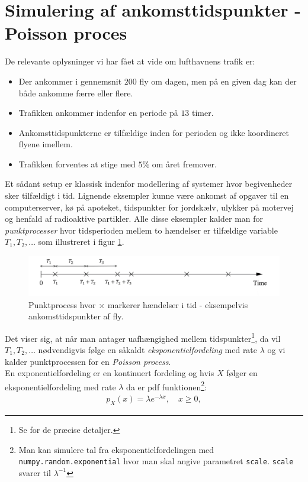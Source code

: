 \documentclass{article}
\begin{document}
\section{Simulering af ankomsttidspunkter - Poisson proces}
De relevante oplysninger vi har fået at vide om lufthavnens trafik er:
\begin{itemize}
\item Der ankommer i gennemsnit $200$ fly om dagen, men på en given dag kan der både ankomme færre eller flere.
\item Trafikken ankommer indenfor en periode på $13$ timer. 
\item Ankomsttidspunkterne er tilfældige inden for perioden og ikke koordineret flyene imellem. 
\item Trafikken forventes at stige med $5\%$ om året fremover. 
\end{itemize}
Et sådant setup er klassisk indenfor modellering af systemer hvor begivenheder sker tilfældigt i tid. Lignende eksempler kunne være ankomst af opgaver til en computerserver, kø på apoteket, tidspunkter for jordskælv, ulykker på motervej og henfald af radioaktive partikler. Alle disse eksempler kalder man for \textit{punktprocesser} hvor tidsperioden mellem to hændelser er tilfældige variable $T_1, T_2,\dots$ som illustreret i figur \ref{fig:process1}. 
\begin{figure}
\centering
\includegraphics[width = \textwidth]{process1.png}
\caption{Punktprocess hvor $\times$ markerer hændelser i tid - eksempelvis ankomsttidspunkter af fly.} \label{fig:process1}
\end{figure}
Det viser sig, at når man antager uafhængighed mellem tidspunkter\footnote{Se \cite[123-127]{olofsson2012} for de præcise detaljer.}, da vil $T_1, T_2,\dots$ nødvendigvis følge en såkaldt \textit{eksponentielfordeling} med rate $\lambda$ og vi kalder punktprocessen for en \textit{Poisson process}. \\
En exponentielfordeling er en kontinuert fordeling og hvis $X$ følger en eksponentielfordeling med rate $\lambda$ da er pdf funktionen\footnote{Man kan simulere tal fra eksponentielfordelingen med \texttt{numpy.random.exponential} hvor man skal angive parametret \texttt{scale}. \texttt{scale} svarer til $\lambda^{-1}$}:
\begin{align*}
p_X(x) = \lambda e^{-\lambda x}, \quad x \geq 0,
\end{align*}
\end{document}

